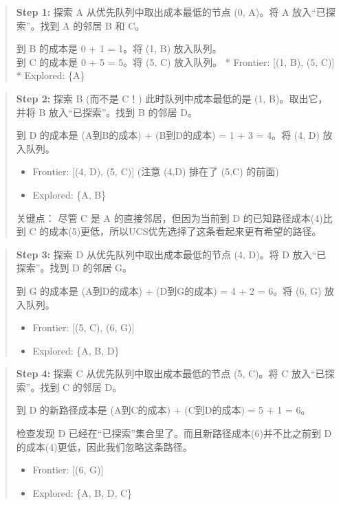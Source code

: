 \documentclass[11pt,a4paper]{article}
\providecommand{\tightlist}{\setlength{\itemsep}{0pt}\setlength{\parskip}{0pt}}
\begin{document}
\begin{quote}
\textbf{Step 1:} 探索 A 从优先队列中取出成本最低的节点 (0, A)。将 A 放入``已探索''。找到 A 的邻居 B 和 C。

到 B 的成本是 0 + 1 = 1。将 (1, B) 放入队列。\\
到 C 的成本是 0 + 5 = 5。将 (5, C) 放入队列。 * Frontier: {[}(1, B), (5, C){]} * Explored: \{A\}
\end{quote}

\begin{quote}
\textbf{Step 2:} 探索 B (而不是 C！) 此时队列中成本最低的是 (1, B)。取出它，并将 B 放入``已探索''。找到 B 的邻居 D。

到 D 的成本是 (A到B的成本) + (B到D的成本) = 1 + 3 = 4。将 (4, D) 放入队列。

\begin{itemize}
\tightlist
\item
  Frontier: {[}(4, D), (5, C){]} (注意 (4,D) 排在了 (5,C) 的前面)
\item
  Explored: \{A, B\}
\end{itemize}

关键点： 尽管 C 是 A 的直接邻居，但因为当前到 D 的已知路径成本(4)比到 C 的成本(5)更低，所以UCS优先选择了这条看起来更有希望的路径。
\end{quote}

\begin{quote}
\textbf{Step 3:} 探索 D 从优先队列中取出成本最低的节点 (4, D)。将 D 放入``已探索''。找到 D 的邻居 G。

到 G 的成本是 (A到D的成本) + (D到G的成本) = 4 + 2 = 6。将 (6, G) 放入队列。

\begin{itemize}
\tightlist
\item
  Frontier: {[}(5, C), (6, G){]}
\item
  Explored: \{A, B, D\}
\end{itemize}
\end{quote}

\begin{quote}
\textbf{Step 4:} 探索 C 从优先队列中取出成本最低的节点 (5, C)。将 C 放入``已探索''。找到 C 的邻居 D。

到 D 的新路径成本是 (A到C的成本) + (C到D的成本) = 5 + 1 = 6。

检查发现 D 已经在``已探索''集合里了。而且新路径成本(6)并不比之前到 D 的成本(4)更低，因此我们忽略这条路径。

\begin{itemize}
\tightlist
\item
  Frontier: {[}(6, G){]}
\item
  Explored: \{A, B, D, C\}
\end{itemize}
\end{quote}
\end{document}
